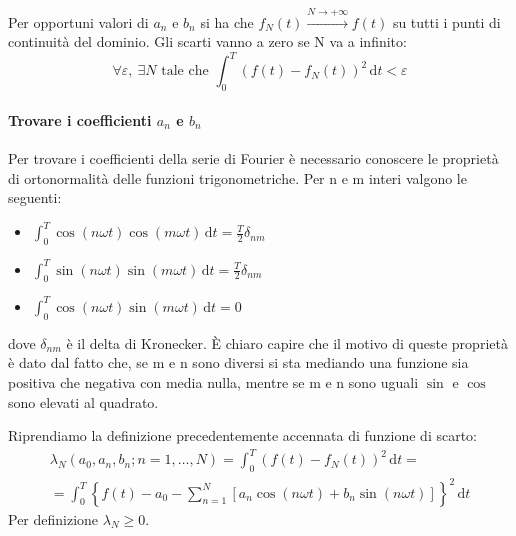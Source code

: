 Per opportuni valori di \(a_n\) e \(b_n\) si ha che \(f_N(t)\xrightarrow{N \to +\infty }f(t)\) su tutti i punti di continuità del dominio. Gli scarti vanno a zero se N va a infinito:
\[
	\forall \varepsilon,\ \exists N \text{ tale che } \int_{0}^{T} (f(t) - f_N(t))^{2}  \,\mathrm{d}t < \varepsilon 
\]

\paragraph{Trovare i coefficienti \(a_n\) e \(b_n\)} Per trovare i coefficienti della serie di Fourier è necessario conoscere le proprietà di ortonormalità delle funzioni trigonometriche. Per n e m interi valgono le seguenti:
\begin{itemize}
	
	\item \(\int_{0}^{T} \cos (n \omega t) \cos (m \omega t) \,\mathrm{d}t = \frac{T}{2} \delta_{nm}  \) 
	\item \(\int_{0}^{T} \sin (n \omega t) \sin (m \omega t) \,\mathrm{d}t = \frac{T}{2} \delta_{nm}  \)
	\item \(\int_{0}^{T} \cos (n \omega t) \sin (m \omega t) \,\mathrm{d}t = 0 \)  
\end{itemize}
dove \(\delta_{nm} \) è il delta di Kronecker. È chiaro capire che il motivo di queste proprietà è dato dal fatto che, se m e n sono diversi si sta mediando una funzione sia positiva che negativa con media nulla, mentre se m e n sono uguali \(\sin \text{ e } \cos \) sono elevati al quadrato.

\begin{definition}
	Riprendiamo la definizione precedentemente accennata di funzione di scarto:
	\begin{gather*}
		\lambda _N (a_0, a_n, b_n; n=1,\dots ,N)=\int_{0}^{T} (f(t)-f_N(t))^{2}  \,\mathrm{d}t=\\
		=\int_{0}^{T} \left\{ f(t) - a_0 - \sum_{n=1}^{N} [a_n \cos (n \omega t) + b_n \sin (n \omega t)] \right\} ^{2}  \,\mathrm{d}t
	\end{gather*}
	Per definizione \(\lambda _N \geq 0\). 
\end{definition}

